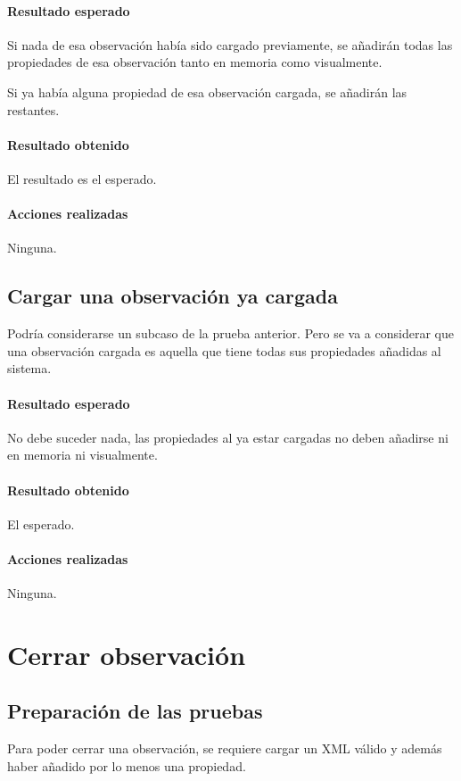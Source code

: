 \paragraph{Resultado esperado}
Si nada de esa observaci\'on hab\'ia sido cargado previamente, se a\~nadir\'an
todas las propiedades de esa observaci\'on tanto en memoria como visualmente.

Si ya hab\'ia alguna propiedad de esa observaci\'on cargada, se a\~nadir\'an las
restantes.

\paragraph{Resultado obtenido}
El resultado es el esperado.

\paragraph{Acciones realizadas}
Ninguna.

\subsection{Cargar una observaci\'on ya cargada}
Podr\'ia considerarse un subcaso de la prueba anterior. Pero se va a 
considerar que una observaci\'on cargada es aquella que tiene todas sus 
propiedades a\~nadidas al sistema.

\paragraph{Resultado esperado}
No debe suceder nada, las propiedades al ya estar cargadas no deben a\~nadirse
ni en memoria ni visualmente.

\paragraph{Resultado obtenido}
El esperado.

\paragraph{Acciones realizadas}
Ninguna.

\section{Cerrar observaci\'on}
\subsection{Preparaci\'on de las pruebas}
Para poder cerrar una observaci\'on, se requiere cargar un XML v\'alido y
adem\'as haber a\~nadido por lo menos una propiedad.

